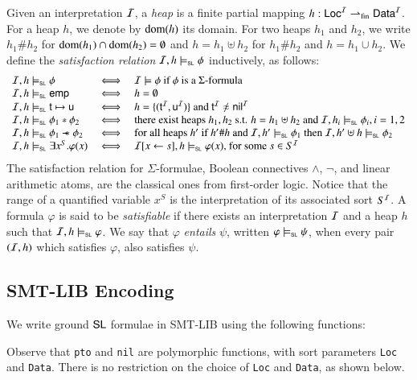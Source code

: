 \documentclass{llncs}
\begin{document}
Given an interpretation $\mathcal{I}$, a \emph{heap} is a finite partial
mapping $h : \mathsf{Loc}^{\mathcal{I}} \rightharpoonup_{\mathrm{fin}} \mathsf{Data}^{\mathcal{I}}$. For a
heap $h$, we denote by $\mathrm{dom}(h)$ its domain. For two heaps $h_1$ and
$h_2$, we write $h_1 \# h_2$ for $\mathrm{dom}(h_1) \cap \mathrm{dom}(h_2) =
\emptyset$ and $h = h_1 \uplus h_2$ for $h_1 \# h_2$ and $h = h_1 \cup
h_2$. We define the \emph{satisfaction relation} $\mathcal{I},h
\models_{\mathsf{\scriptscriptstyle{SL}}} \phi$ inductively, as follows:
\[\begin{array}{lcl}
\I,h \models_{\tinyseplog} \phi & \iff & \I \models \phi \text{ if $\phi$ is a $\Sigma$-formula} \\
\I,h \models_{\tinyseplog} \emp & \iff & h = \emptyset \\
\I,h \models_{\tinyseplog} \tterm \mapsto \uterm & \iff & 
h = \{(\tterm^\I,\uterm^\I)\} \text{ and } \tterm^\I\not\teq\nil^\I \\
\I,h \models_{\tinyseplog} \phi_1 * \phi_2 & \iff & \text{there exist heaps } h_1,h_2 
\text{ s.t. } h=h_1\uplus h_2 
\text{ and } \I,h_i \models_{\tinyseplog} \phi_i, i = 1,2 \\
\I,h \models_{\tinyseplog} \phi_1 \wand \phi_2 & \iff & \text{for all heaps } h' \text{ if } h'\#h 
\text{ and } \I,h' \models_{\tinyseplog} \phi_1
\text{ then } \I,h'\uplus h \models_{\tinyseplog} \phi_2 \\
\I,h \models_{\tinyseplog} \exists x^S . \varphi(x) & \iff & 
\I[x \leftarrow s],h \models_{\tinyseplog} \varphi(x) \text{, for some }s \in S^\I
\end{array}\]
The satisfaction relation for $\Sigma$-formulae, Boolean connectives
$\wedge$, $\neg$, and linear arithmetic atoms, are the classical ones
from first-order logic. Notice that the range of a quantified variable
$x^S$ is the interpretation of its associated sort $S^{\mathcal{I}}$. A formula
$\varphi$ is said to be \emph{satisfiable} if there exists an
interpretation $\mathcal{I}$ and a heap $h$ such that $\mathcal{I},h
\models_{\mathsf{\scriptscriptstyle{SL}}} \varphi$. We say that $\varphi$ \emph{entails}
$\psi$, written $\varphi \models_{\mathsf{\scriptscriptstyle{SL}}} \psi$, when every pair
$(\mathcal{I},h)$ which satisfies $\varphi$, also satisfies $\psi$.

\subsection{SMT-LIB Encoding}

We write ground $\mathsf{SL}$ formulae in SMT-LIB using the following functions: 
\begin{center}
\end{center}
Observe that {\tt pto} and {\tt nil} are polymorphic functions, with
sort parameters {\tt Loc} and {\tt Data}. There is no restriction on
the choice of {\tt Loc} and {\tt Data}, as shown below. 
\end{document}
